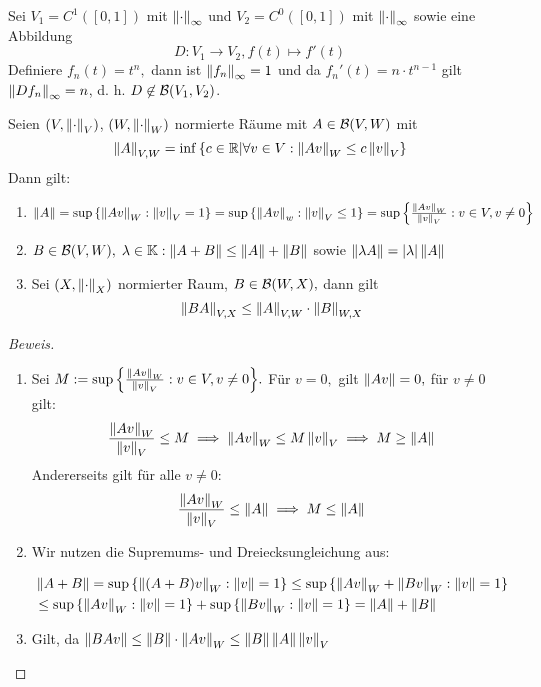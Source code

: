 \begin{ex} \label{Differential_op}
    Sei $V_1 = C^1([0, 1])$ mit $\norms{\cdot}$ und $V_2 = C^0([0, 1])$ mit $\norms{\cdot}$ sowie eine Abbildung \[D: V_1 \to V_2, f(t) \mapsto f'(t)\]
    Definiere $f_n(t) = t^n,$ dann ist $\norms{f_n} = 1$ und da $f_n'(t) = n \cdot t^{n-1}$ gilt $\norms{Df_n} = n$, d. h. \(D \not\in \B(V_1, V_2)\).
\end{ex}

\begin{theorem}
    Seien $(V, \normn\cdot V)$, $(W, \norm{\cdot}_W)$ normierte Räume mit $ A \in \B(V, W)$ mit \[\norm{A}_{V,W} = \inf{\set{c \in \mathbb{R}| \forall v \in V: \norm{Av}_{W} \leq c\normn{v}{V}}}\] Dann gilt:
    \begin{enumerate}
        \item $\norm{A} = \sup{\set{\norm{Av}_W: \norm{v}_V = 1}} = \sup{\set{\norm{Av}_w: \norm{v}_V \leq 1}} = \sup{\set{\frac{\norm{Av}_W}{\norm{v}_V}: v \in V, v \not=0}}$
        \item $B \in \B(V, W), \;\lambda \in \K: \norm{A +B} \le \norm{A}+\norm{B}$ sowie $\norm{\lambda A} = \ab{\lambda}\norm{A}$
        \item Sei $(X, \norm{\cdot}_X)$ normierter Raum, $B \in \B(W, X),$ dann gilt 
        \[\norm{BA}_{V,X} \leq \norm{A}_{V,W}\cdot\norm{B}_{W,X}\]
    \end{enumerate}
    
    \begin{proof}[Beweis]
    \begin{enumerate}
        \item Sei $M := \sup{\set{\frac{\norm{Av}_W}{\norm{v}_V}: v\in V, v \not= 0}}.$ Für $v = 0,$ gilt $\norm{Av} = 0,$ für $v \not=0$ gilt:
        \[\frac{\norm{Av}_W}{\norm{v}_V} \leq M \implies \norm{Av}_W \leq M \norm{v}_V \implies M \geq \norm{A}\]
        Andererseits gilt für alle $v \not= 0:$
        \[\frac{\norm{Av}_W}{\norm{v}_V} \leq \norm{A} \implies M \leq \norm A\]
        \item Wir nutzen die Supremums- und Dreiecksungleichung aus:
        
        \begin{align*}
        & \norm{A+B} = \sup{\set{\norm{(A+B)v}_W: \norm{v} = 1}} \leq \sup{\set{\norm{Av}_W+\norm{Bv}_W: \norm{v} = 1}} \\
        & \leq \sup{\set{\norm{Av}_W: \norm{v} = 1}} + \sup{\set{\norm{Bv}_W: \norm{v} = 1}} = \norm{A}+ \norm{B}
        \end{align*}
        \item Gilt, da $\norm{BAv} \leq \norm{B}\cdot \norm{Av}_W \leq \norm{B} \norm{A} \norm{v}_V$
        
    \end{enumerate}
    \end{proof}
\end{theorem}

